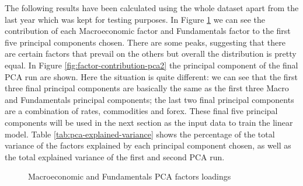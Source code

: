 The following results have been calculated using the whole dataset apart from the last year which was kept for testing purposes.
In Figure \ref{fig:factor-contribution-pca1} we can see the contribution of each Macroeconomic factor and Fundamentals factor to the first five principal components chosen. There are some peaks, suggesting that there are certain factors that prevail on the others but overall the distribution is pretty equal.
In Figure \ref{fig:factor-contribution-pca2} the principal component of the final PCA run are shown. Here the situation is quite different: we can see that the first three final principal components are basically the same as the first three Macro and Fundamentals principal components; the last two final principal components are a combination of rates, commodities and forex.
These final five principal components will be used in the next section as the input data to train the linear model.
Table \ref{tab:pca-explained-variance} shows the percentage of the total variance of the factors explained by each principal component chosen, as well as the total explained variance of the first and second PCA run.

\begin{table}[htb]
	\centering
	\caption{Percentages of explained variance for each principal component and the total variance for the first and second PCA run}
	\label{tab:pca-explained-variance}
\end{table} 

\begin{figure}[htb]
	\centering
	
	\caption{Macroeconomic and Fundamentals PCA factors loadings}
	\label{fig:factor-contribution-pca1}
\end{figure}

